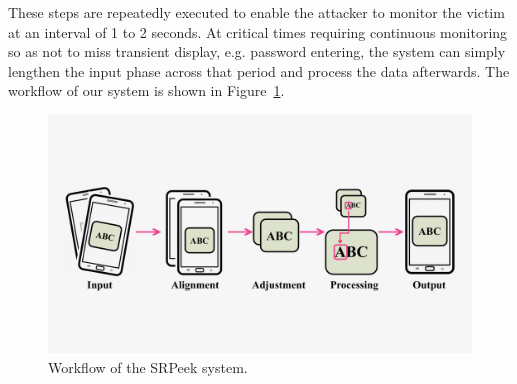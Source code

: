 These steps are repeatedly executed to enable the attacker to monitor the victim at an interval of 1 to 2 seconds. At critical times requiring continuous monitoring so as not to miss transient display, e.g. password entering, the system can simply lengthen the input phase across that period and process the data afterwards. The workflow of our system is shown in Figure~\ref{fig-workflow}.
\begin{figure}
  \centering
     \includegraphics[width=0.90\linewidth]{./pic/workflow_cl.pdf}
     \caption{Workflow of the \textsf{SRPeek} system.}
     \label{fig-workflow}
\end{figure}


